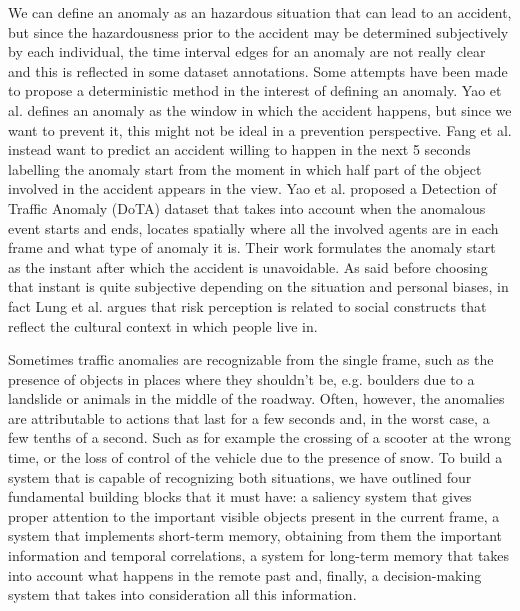 We can define an anomaly as an hazardous situation that can lead to an accident, but since the hazardousness prior to the accident may be determined subjectively by each individual, the time interval edges for an anomaly are not really clear and this is reflected in some dataset annotations.
Some attempts have been made to propose a deterministic method in the interest of defining an anomaly.
Yao et al. \cite{yao2019unsupervised} defines an anomaly as the window in which the accident happens, but since we want to prevent it, this might not be ideal in a prevention perspective. 
Fang et al. \cite{fang2019dada} instead want to predict an accident willing to happen in the next 5 seconds labelling the anomaly start from the moment in which half part of the object involved in the accident appears in the view.
Yao et al. \cite{yao2020when} proposed a Detection of Traffic Anomaly (DoTA) dataset that takes into account when the anomalous event starts and ends, locates spatially where all the involved agents are in each frame and what type of anomaly it is.
Their work formulates the anomaly start as the instant after which the accident is unavoidable.
As said before choosing that instant is quite subjective depending on the situation and personal biases, in fact Lung et al. \cite{lund2009riskperception} argues that risk perception is related to social constructs that reflect the cultural context in which people live in.

Sometimes traffic anomalies are recognizable from the single frame, such as the presence of objects in places where they shouldn't be, e.g. boulders due to a landslide or animals in the middle of the roadway.
Often, however, the anomalies are attributable to actions that last for a few seconds and, in the worst case, a few tenths of a second.
Such as for example the crossing of a scooter at the wrong time, or the loss of control of the vehicle due to the presence of snow.
To build a system that is capable of recognizing both situations, we have outlined four fundamental building blocks that it must have: a saliency system that gives proper attention to the important visible objects present in the current frame, a system that implements short-term memory, obtaining from them the important information and temporal correlations, a system for long-term memory that takes into account what happens in the remote past and, finally, a decision-making system that takes into consideration all this information.

